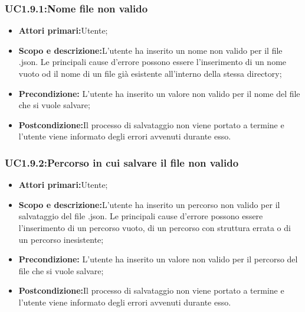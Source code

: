 \subsubsection{UC1.9.1:Nome file non valido}
\begin{itemize}
	\item{\textbf{Attori primari:}Utente;}
	\item{\textbf{Scopo e descrizione:}L'utente ha inserito un nome non valido per il file .json. Le principali cause d'errore possono essere l'inserimento di un nome vuoto od il nome di un file già esistente all'interno della stessa directory;}
	\item{\textbf{Precondizione:} L'utente ha inserito un valore non valido per il nome del file che si vuole salvare;}
	\item{\textbf{Postcondizione:}Il processo di salvataggio non viene portato a termine e l'utente viene informato degli errori avvenuti durante esso.}
\end{itemize}
\subsubsection{UC1.9.2:Percorso in cui salvare il file non valido}
\begin{itemize}
	\item{\textbf{Attori primari:}Utente;}
	\item{\textbf{Scopo e descrizione:}L'utente ha inserito un percorso non valido per il salvataggio del file .json. Le principali cause d'errore possono essere l'inserimento di un percorso vuoto, di un percorso con struttura errata o di un percorso inesistente;}
	\item{\textbf{Precondizione:} L'utente ha inserito un valore non valido per il percorso del file che si vuole salvare;}
	\item{\textbf{Postcondizione:}Il processo di salvataggio non viene portato a termine e l'utente viene informato degli errori avvenuti durante esso.}
\end{itemize}